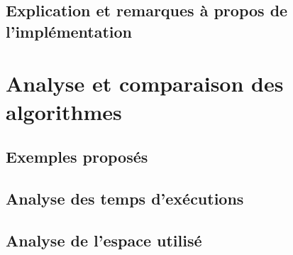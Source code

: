\documentclass{article}
\begin{document}
\subsection{Explication et remarques à propos de l'implémentation}


\section{Analyse et comparaison des algorithmes}
\subsection{Exemples proposés}
\subsection{Analyse des temps d'exécutions}
\subsection{Analyse de l'espace utilisé}
\end{document}

